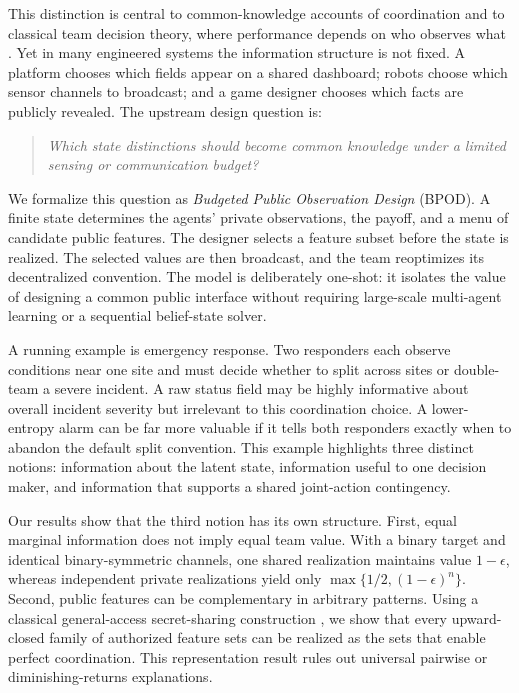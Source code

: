 This distinction is central to common-knowledge accounts of coordination \cite{Rubinstein1989,HalpernMoses1990,Morris2002} and to classical team decision theory, where performance depends on who observes what \cite{Radner1962,MarschakRadner1972,HoChu1972,Witsenhausen1971}. Yet in many engineered systems the information structure is not fixed. A platform chooses which fields appear on a shared dashboard; robots choose which sensor channels to broadcast; and a game designer chooses which facts are publicly revealed. The upstream design question is:
\begin{quote}
\emph{Which state distinctions should become common knowledge under a limited sensing or communication budget?}
\end{quote}

We formalize this question as \emph{Budgeted Public Observation Design} (BPOD). A finite state determines the agents' private observations, the payoff, and a menu of candidate public features. The designer selects a feature subset before the state is realized. The selected values are then broadcast, and the team reoptimizes its decentralized convention. The model is deliberately one-shot: it isolates the value of designing a common public interface without requiring large-scale multi-agent learning or a sequential belief-state solver.

A running example is emergency response. Two responders each observe conditions near one site and must decide whether to split across sites or double-team a severe incident. A raw status field may be highly informative about overall incident severity but irrelevant to this coordination choice. A lower-entropy alarm can be far more valuable if it tells both responders exactly when to abandon the default split convention. This example highlights three distinct notions: information about the latent state, information useful to one decision maker, and information that supports a shared joint-action contingency.

Our results show that the third notion has its own structure. First, equal marginal information does not imply equal team value. With a binary target and identical binary-symmetric channels, one shared realization maintains value $1-\epsilon$, whereas independent private realizations yield only $\max\{1/2,(1-\epsilon)^n\}$. Second, public features can be complementary in arbitrary patterns. Using a classical general-access secret-sharing construction \cite{ItoEtAl1989,Beimel2011}, we show that every upward-closed family of authorized feature sets can be realized as the sets that enable perfect coordination. This representation result rules out universal pairwise or diminishing-returns explanations.

